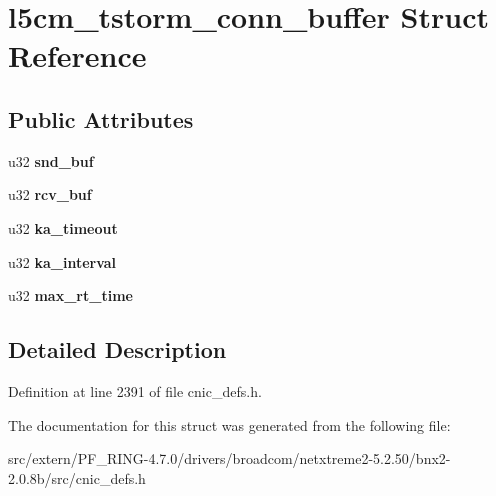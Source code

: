 \hypertarget{structl5cm__tstorm__conn__buffer}{
\section{l5cm\_\-tstorm\_\-conn\_\-buffer Struct Reference}
\label{structl5cm__tstorm__conn__buffer}
}
\subsection*{Public Attributes}
\begin{DoxyCompactItemize}
\item 
\hypertarget{structl5cm__tstorm__conn__buffer_a7ffa312287f58b2929492b2837eea260}{
u32 {\bfseries snd\_\-buf}}
\label{structl5cm__tstorm__conn__buffer_a7ffa312287f58b2929492b2837eea260}

\item 
\hypertarget{structl5cm__tstorm__conn__buffer_ad703648734a61c6c5d68ed0b5894ba5e}{
u32 {\bfseries rcv\_\-buf}}
\label{structl5cm__tstorm__conn__buffer_ad703648734a61c6c5d68ed0b5894ba5e}

\item 
\hypertarget{structl5cm__tstorm__conn__buffer_ac95b24b8bbdc25c7b6f0eacfedd568e4}{
u32 {\bfseries ka\_\-timeout}}
\label{structl5cm__tstorm__conn__buffer_ac95b24b8bbdc25c7b6f0eacfedd568e4}

\item 
\hypertarget{structl5cm__tstorm__conn__buffer_a1b9a73e39448f8ad8f738fd0dfcd7f2b}{
u32 {\bfseries ka\_\-interval}}
\label{structl5cm__tstorm__conn__buffer_a1b9a73e39448f8ad8f738fd0dfcd7f2b}

\item 
\hypertarget{structl5cm__tstorm__conn__buffer_aba3378147e21e294e1ec7a4e864b79f6}{
u32 {\bfseries max\_\-rt\_\-time}}
\label{structl5cm__tstorm__conn__buffer_aba3378147e21e294e1ec7a4e864b79f6}

\end{DoxyCompactItemize}


\subsection{Detailed Description}


Definition at line 2391 of file cnic\_\-defs.h.



The documentation for this struct was generated from the following file:\begin{DoxyCompactItemize}
\item 
src/extern/PF\_\-RING-\/4.7.0/drivers/broadcom/netxtreme2-\/5.2.50/bnx2-\/2.0.8b/src/cnic\_\-defs.h\end{DoxyCompactItemize}

